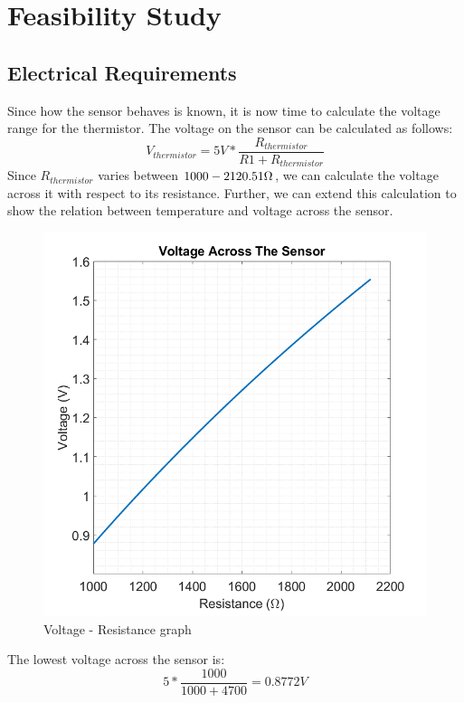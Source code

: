 \section*{Feasibility Study}

\subsection*{Electrical Requirements}
Since how the sensor behaves is known, it is now time to calculate the voltage range for the thermistor. The voltage on the sensor can be calculated as follows:
\begin{equation}
    V_{thermistor} = 5V * \frac{R_{thermistor}}{R1 + R_{thermistor}}
\end{equation}
Since $R_{thermistor}$ varies between $1000 - 2120.51 \ohm$, we can calculate the voltage across it with respect to its resistance. Further, we can extend this calculation to show the relation between temperature and voltage across the sensor.
\begin{figure}[H]
    \centering
    \includegraphics[scale=0.4]{pics/ptc_res_volt}
    \caption{Voltage - Resistance graph}
\end{figure}
The lowest voltage across the sensor is:
\begin{equation}
    5*\frac{1000}{1000+4700}= 0.8772 V
\end{equation}
